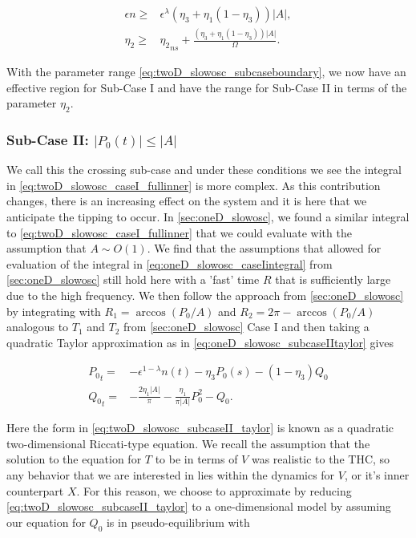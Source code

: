 \begin{equation}\label{eq:twoD_slowosc_subcaseboundary}
\begin{aligned}
\epsilon n \ge & \epsilon^\lambda (\eta_3+\eta_1(1-\eta_3))|A|,\\
\eta_2 \ge& {\eta_2}_{ns} +\frac{(\eta_3+\eta_1(1-\eta_3))|A|}{\Omega}.
\end{aligned}
\end{equation}

With the parameter range \eqref{eq:twoD_slowosc_subcaseboundary}, we now have an effective region for Sub-Case I and have the range for Sub-Case II in terms of the parameter $\eta_2$.

\subsubsection{Sub-Case II: $|P_0(t)|\le |A|$}

We call this the crossing sub-case and under these conditions we see the integral in \eqref{eq:twoD_slowosc_caseI_fullinner} is more complex. As this contribution changes, there is an increasing effect on the system and it is here that we anticipate the tipping to occur. In \autoref{sec:oneD_slowosc}, we found a similar integral to \eqref{eq:twoD_slowosc_caseI_fullinner} that we could evaluate with the assumption that $A\sim O(1)$. We find that the assumptions that allowed for evaluation of the integral in \eqref{eq:oneD_slowosc_caseIintegral} from \autoref{sec:oneD_slowosc} still hold here with a 'fast' time $R$ that is sufficiently large due to the high frequency. We then follow the approach from \autoref{sec:oneD_slowosc} by integrating with $R_1=\arccos(P_0/A)$ and $R_2 = 2\pi-\arccos(P_0/A)$ analogous to $T_1$ and $T_2$ from \autoref{sec:oneD_slowosc} Case I and then taking a quadratic Taylor approximation as in \eqref{eq:oneD_slowosc_subcaseIItaylor} gives

\begin{equation}\label{eq:twoD_slowosc_subcaseII_taylor}
\begin{aligned}
{P_0}_t =& -\epsilon^{1-\lambda}n(t)-\eta_3 P_0(s)-(1-\eta_3)Q_0\\
{Q_0}_t =&-\frac{2\eta_1|A|}{\pi}-\frac{\eta_1}{\pi|A|}P_0^2-Q_0.
\end{aligned}
\end{equation}

Here the form in \eqref{eq:twoD_slowosc_subcaseII_taylor} is known as a quadratic two-dimensional Riccati-type equation. We recall the assumption that the solution to the equation for $T$ to be in terms of $V$ was realistic to the THC, so any behavior that we are interested in lies within the dynamics for $V$, or it's inner counterpart $X$. For this reason, we choose to approximate by reducing \eqref{eq:twoD_slowosc_subcaseII_taylor} to a one-dimensional model by assuming our equation for $Q_0$ is in pseudo-equilibrium with 

